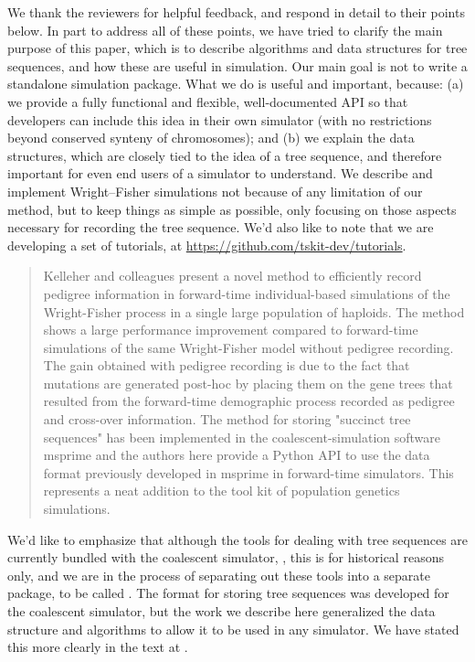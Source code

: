 We thank the reviewers for helpful feedback, and respond in detail to their points below.
In part to address all of these points,
we have tried to clarify the main purpose of this paper, which is
to describe algorithms and data structures for tree sequences,
and how these are useful in simulation.
Our main goal is not to write a standalone simulation package.
What we do is useful and important, because: 
(a) we provide a fully functional and flexible, well-documented API
so that developers can include this idea in their own simulator
(with no restrictions beyond conserved synteny of chromosomes); and
(b) we explain the data structures,
which are closely tied to the idea of a tree sequence,
and therefore important for even end users of a simulator to understand.
We describe and implement Wright--Fisher simulations not because of any limitation of our method,
but to keep things as simple as possible, only focusing on those aspects necessary 
for recording the tree sequence.
We'd also like to note that we are developing a set of tutorials,
at \url{https://github.com/tskit-dev/tutorials}.


\begin{quote}
    Kelleher and colleagues present a novel method to efficiently record pedigree
    information in forward-time individual-based simulations of the Wright-Fisher
    process in a single large population of haploids. The method shows a large
    performance improvement compared to forward-time simulations of the same
    Wright-Fisher model without pedigree recording. The gain obtained with pedigree
    recording is due to the fact that mutations are generated post-hoc by placing
    them on the gene trees that resulted from the forward-time demographic process
    recorded as pedigree and cross-over information. The method for storing
    "succinct tree sequences" has been implemented in the coalescent-simulation
    software msprime and the authors here provide a Python API to use the data
    format previously developed in msprime in forward-time simulators. This
    represents a neat addition to the tool kit of population genetics simulations.
\end{quote}

We'd like to emphasize that although the tools for dealing with tree sequences
are currently bundled with the coalescent simulator, \msprime{},
this is for historical reasons only, 
and we are in the process of separating out these tools into a separate package,
to be called \tskit.
The format for storing tree sequences was developed for the coalescent simulator,
but the work we describe here generalized the data structure and algorithms
to allow it to be used in any simulator.
We have stated this more clearly in the text at .

